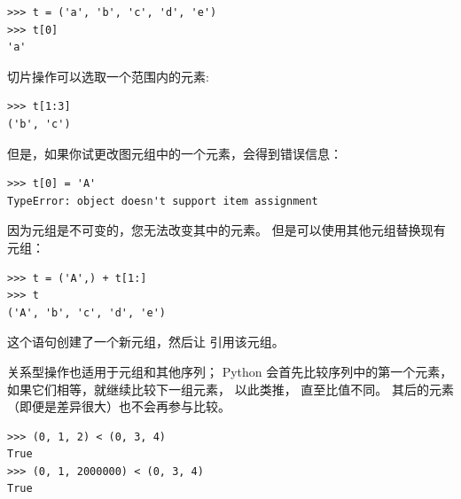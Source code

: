 \begin{lstlisting}
>>> t = ('a', 'b', 'c', 'd', 'e')
>>> t[0]
'a'
\end{lstlisting}
%

切片操作可以选取一个范围内的元素:
  
  
  
  

\begin{lstlisting}
>>> t[1:3]
('b', 'c')
\end{lstlisting}
%

但是，如果你试更改图元组中的一个元素，会得到错误信息：

  
  

\begin{lstlisting}
>>> t[0] = 'A'
TypeError: object doesn't support item assignment
\end{lstlisting}

%

因为元组是不可变的，您无法改变其中的元素。  
但是可以使用其他元组替换现有元组：

\begin{lstlisting}
>>> t = ('A',) + t[1:]
>>> t
('A', 'b', 'c', 'd', 'e')
\end{lstlisting}
%

这个语句创建了一个新元组，然后让  引用该元组。


关系型操作也适用于元组和其他序列； 
Python 会首先比较序列中的第一个元素， 如果它们相等，就继续比较下一组元素， 
以此类推， 直至比值不同。  
其后的元素（即便是差异很大）也不会再参与比较。


\begin{lstlisting}
>>> (0, 1, 2) < (0, 3, 4)
True
>>> (0, 1, 2000000) < (0, 3, 4)
True
\end{lstlisting}


